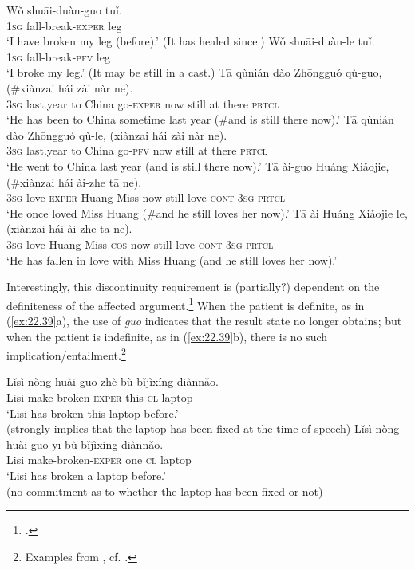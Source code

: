 \ea \label{ex:22.36}
\ea  \gll Wǒ  shuāi-duàn-guo  tuǐ.\\
\textsc{1sg}  fall-break-\textsc{exper}  leg\\
\glt ‘I have broken my leg (before).’ (It has healed since.) 
\ex \gll Wǒ  shuāi-duàn-le  tuǐ.\\
\textsc{1sg}  fall-break-\textsc{pfv}  leg\\
\glt ‘I broke my leg.’  (It may be still in a cast.)  
\z 
\ex \label{ex:22.37}
\ea \gll Tā  qùnián  dào  Zhōngguó  qù-guo,  (\#xiànzai  hái  zài  nàr  ne).\\
\textsc{3sg}  last.year  to  China  go-\textsc{exper}    now  still  at  there  \textsc{prtcl}\\
\glt ‘He has been to China sometime last year (\#and is still there now).’ 
\ex \gll  Tā  qùnián  dào  Zhōngguó  qù-le,  (xiànzai  hái  zài  nàr  ne).\\
\textsc{3sg}  last.year  to  China  go-\textsc{pfv} now  still  at  there  \textsc{prtcl}\\
\glt ‘He went to China last year (and is still there now).’ 
\z 
\ex \label{ex:22.38}
\ea \gll  Tā  ài-guo  Huáng  Xiǎojie,  (\#xiànzai  hái  ài-zhe  tā  ne).\\
\textsc{3sg}  love-\textsc{exper}  Huang  Miss now  still  love-\textsc{cont}  \textsc{3sg}  \textsc{prtcl}\\
\glt ‘He once loved Miss Huang (\#and he still loves her now).’ 
\ex \gll  Tā  ài  Huáng  Xiǎojie  le,  (xiànzai  hái  ài-zhe  tā  ne).\\
\textsc{3sg}  love  Huang  Miss \textsc{cos} now  still  love-\textsc{cont}  \textsc{3sg}  \textsc{prtcl}\\
\glt ‘He has fallen in love with Miss Huang (and he still loves her now).’  
\z \z


Interestingly, this discontinuity requirement is (partially?) dependent on the definiteness of the affected argument.\footnote{\citet{Lin2007,Wu2008,Chen2009}.} When the patient is definite, as in (\ref{ex:22.39}a), the use of \textit{guo} indicates that the result state no longer obtains; but when the patient is indefinite, as in (\ref{ex:22.39}b), there is no such implication/entailment.\footnote{Examples from \citet{Chen2009}, cf. \citet{Lin2007}.}


\ea \label{ex:22.39}
\ea  \gll Lǐsì  nòng-huài-guo  zhè  bù  bǐjìxíng-diànnǎo.\\
Lisi  make-broken-\textsc{exper}  this  \textsc{cl}  laptop\\
\glt ‘Lisi has broken this laptop before.’\\
(strongly implies that the laptop has been fixed at the time of speech)
\ex \gll  Lǐsì  nòng-huài-guo  yī  bù  bǐjìxíng-diànnǎo.\\
Lisi  make-broken-\textsc{exper}  one  \textsc{cl}  laptop\\
\glt ‘Lisi has broken a laptop before.’  \\
(no commitment as to whether the laptop has been fixed or not)
\z \z


